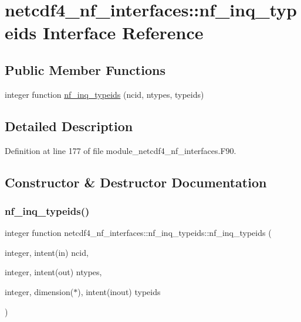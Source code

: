 \hypertarget{interfacenetcdf4__nf__interfaces_1_1nf__inq__typeids}{}\section{netcdf4\+\_\+nf\+\_\+interfaces\+:\+:nf\+\_\+inq\+\_\+typeids Interface Reference}
\label{interfacenetcdf4__nf__interfaces_1_1nf__inq__typeids}
\subsection*{Public Member Functions}
\begin{DoxyCompactItemize}
\item 
integer function \hyperlink{interfacenetcdf4__nf__interfaces_1_1nf__inq__typeids_a69974d26d9f0a7599dc1b71ef287162b}{nf\+\_\+inq\+\_\+typeids} (ncid, ntypes, typeids)
\end{DoxyCompactItemize}


\subsection{Detailed Description}


Definition at line 177 of file module\+\_\+netcdf4\+\_\+nf\+\_\+interfaces.\+F90.



\subsection{Constructor \& Destructor Documentation}
\mbox{\label{interfacenetcdf4__nf__interfaces_1_1nf__inq__typeids_a69974d26d9f0a7599dc1b71ef287162b}} 
\subsubsection{\texorpdfstring{nf\+\_\+inq\+\_\+typeids()}{nf\_inq\_typeids()}}
{\footnotesize\ttfamily integer function netcdf4\+\_\+nf\+\_\+interfaces\+::nf\+\_\+inq\+\_\+typeids\+::nf\+\_\+inq\+\_\+typeids (\begin{DoxyParamCaption}\item[{integer, intent(in)}]{ncid,  }\item[{integer, intent(out)}]{ntypes,  }\item[{integer, dimension($\ast$), intent(inout)}]{typeids }\end{DoxyParamCaption})}



